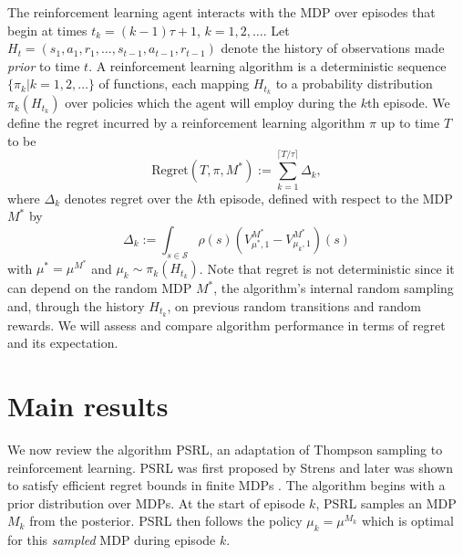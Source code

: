 \documentclass{article}
\newcommand{\Sc}{\mathcal{S}}
\begin{document}
The reinforcement learning agent interacts with the MDP over episodes that begin at times $t_k = (k-1) \tau + 1$, $k=1,2,\ldots$.
Let $H_t = (s_1,a_1,r_1,\ldots,s_{t-1},a_{t-1},r_{t-1})$ denote the history of observations made \emph{prior} to time $t$.
A reinforcement learning algorithm is a deterministic sequence $\{\pi_k | k = 1, 2, \ldots\}$ of functions, each mapping $H_{t_k}$ to a probability distribution $\pi_{k}(H_{t_k})$ over policies which the agent will employ during the $k$th episode.
We define the regret incurred by a reinforcement learning algorithm $\pi$ up to time $T$ to be
$$\text{Regret}(T, \pi, M^*) := \sum_{k=1}^{\lceil T/\tau \rceil} \Delta_k,$$
where $\Delta_k$ denotes regret over the $k$th episode, defined with respect to the MDP $M^*$ by
$$\Delta_k := \int_{s \in \Sc} \rho(s) \left(V^{M^*}_{\mu^*, 1} - V^{M^{*}}_{\mu_k, 1}\right)(s) $$
with $\mu^* = \mu^{M^*}$ and $\mu_{k}\sim \pi_{k}(H_{t_k})$. Note that regret is not deterministic since it can depend on the random MDP $M^*$, the algorithm's internal random sampling and, through the history $H_{t_k}$, on previous random transitions and random rewards. We will assess and compare algorithm performance in terms of regret and its expectation.



\section{Main results}
We now review the algorithm PSRL, an adaptation of Thompson sampling \cite{thompson1933} to reinforcement learning.
PSRL was first proposed by Strens \cite{strens2000bayesian} and later was shown to satisfy efficient regret bounds in finite MDPs \cite{osband2013more}.
The algorithm begins with a prior distribution over MDPs.
At the start of episode $k$, PSRL samples an MDP $M_k$ from the posterior.
PSRL then follows the policy $\mu_k = \mu^{M_k}$ which is optimal for this \emph{sampled} MDP during episode $k$.
\end{document}
